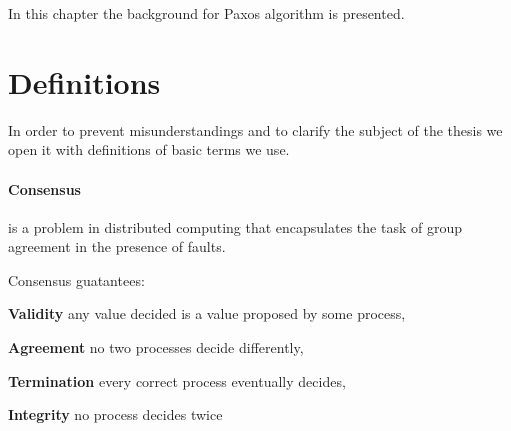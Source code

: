 
%

In this chapter the background for Paxos algorithm is presented.



\section{Definitions}

In order to prevent misunderstandings and to clarify the subject of the thesis we open it with definitions of
basic %
terms we use.


\paragraph{Consensus}
is a problem in distributed computing that encapsulates the task of group agreement in the presence of faults.

Consensus guatantees:

\begin{tightList}[\setlength{\leftmargin}{2\leftmargin}]
    \item[\textbf{Validity}] any value decided is a value proposed by some process,
    \item[\textbf{Agreement}] no two processes decide differently,
    \item[\textbf{Termination}] every correct process eventually decides,
    \item[\textbf{Integrity}] no process decides twice
\end{tightList}

